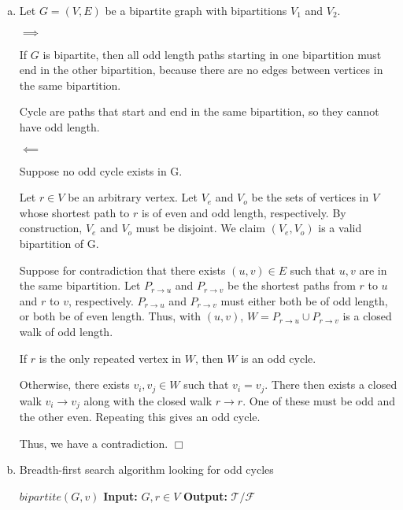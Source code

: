 \documentclass[10pt]{article}
\newenvironment{proof}{\par\noindent{\it Proof.}\hspace*{1em}}{$\Box$\bigskip}
\begin{document}
\begin{solution}
    
    \begin{enumerate}[(a)]
        \item {
            \begin{proof}

                Let $G = (V, E)$ be a bipartite graph with bipartitions $V_1$ and $V_2$. 

                $\implies$

                If $G$ is bipartite, then all odd length paths starting in one bipartition must end in the other bipartition, 
                because there are no edges between vertices in the same bipartition. 

                Cycle are paths that start and end in the same bipartition, so they cannot have odd length. 

                $\impliedby$

                Suppose no odd cycle exists in G. 

                Let $r \in V$ be an arbitrary vertex. 
                Let $V_e$ and $V_o$ be the sets of vertices in $V$ whose shortest path to $r$ is of even and odd length, respectively. 
                By construction, $V_e$ and $V_o$ must be disjoint. 
                We claim $(V_e, V_o)$ is a valid bipartition of G.

                Suppose for contradiction that there exists $(u, v) \in E$ such that $u, v$ are in the same bipartition. 
                Let $P_{r \rightarrow u}$ and $P_{r \rightarrow v}$ be the shortest paths from $r$ to $u$ and $r$ to $v$, respectively. 
                $P_{r \rightarrow u}$ and $P_{r \rightarrow v}$ must either both be of odd length, or both be of even length. 
                Thus, with $(u, v)$, $W = P_{r \rightarrow u} \cup P_{r \rightarrow v}$ is a closed walk of odd length. 
                
                If $r$ is the only repeated vertex in $W$, then $W$ is an odd cycle. 

                Otherwise, there exists $v_i, v_j \in W$ such that $v_i = v_j$. 
                There then exists a closed walk $v_i \rightarrow v_j$ along with the closed walk $r \rightarrow r$. 
                One of these must be odd and the other even. 
                Repeating this gives an odd cycle. 

                Thus, we have a contradiction. 
            \end{proof}
        }
        \item{
            \begin{algorithm}[H]
                \caption{Breadth-first search algorithm looking for odd cycles}
                \begin{algorithmic}[1]
                    \Statex \textbf{$bipartite(G, v)$}
                    \Statex \textbf{Input:} $G, r \in V$
                    \Statex \textbf{Output:} $\mathcal{T/F}$
                    

\end{algorithmic}
\end{algorithm}}
\end{enumerate}
\end{solution}
\end{document}
